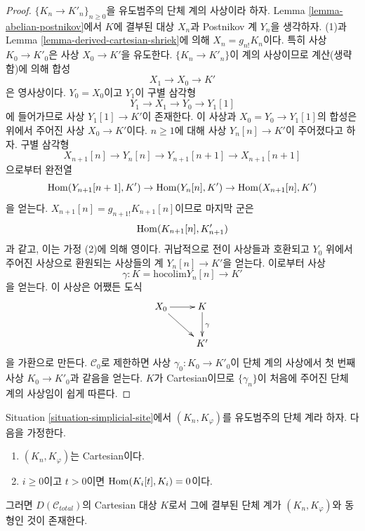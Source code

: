 \begin{proof}
$\{K_n \to K'_n\}_{n \geq 0}$을 유도범주의 단체 계의 사상이라 하자.
Lemma \ref{lemma-abelian-postnikov}에서 $K$에 결부된 대상
$X_n$과 Postnikov 계 $Y_n$을 생각하자.
(1)과 Lemma \ref{lemma-derived-cartesian-shriek}에 의해
$X_n = g_{n!}K_n$이다. 특히 사상 $K_0 \to K'_0$은
사상 $X_0 \to K'$을 유도한다. $\{K_n \to K'_n\}$이
계의 사상이므로 계산(생략함)에 의해 합성
$$
X_1 \to X_0 \to K'
$$
은 영사상이다. $Y_0 = X_0$이고 $Y_1$이 구별 삼각형
$$
Y_1 \to X_1 \to Y_0 \to Y_1[1]
$$
에 들어가므로 사상 $Y_1[1] \to K'$이 존재한다.
이 사상과 $X_0 = Y_0 \to Y_1[1]$의 합성은 위에서 주어진
사상 $X_0 \to K'$이다.
$n \geq 1$에 대해 사상 $Y_n[n] \to K'$이 주어졌다고 하자.
구별 삼각형
$$
X_{n + 1}[n] \to Y_n[n] \to Y_{n + 1}[n + 1] \to X_{n + 1}[n + 1]
$$
으로부터 완전열
$$
\mathop{\mathrm{Hom}}\nolimits(Y_{n + 1}[n + 1], K') \to
\mathop{\mathrm{Hom}}\nolimits(Y_n[n], K') \to
\mathop{\mathrm{Hom}}\nolimits(X_{n + 1}[n], K')
$$
을 얻는다. $X_{n + 1}[n] = g_{n + 1!}K_{n + 1}[n]$이므로
마지막 군은
$$
\mathop{\mathrm{Hom}}\nolimits(K_{n + 1}[n], K'_{n + 1})
$$
과 같고, 이는 가정 (2)에 의해 영이다.
귀납적으로 전이 사상들과 호환되고 $Y_0$ 위에서 주어진 사상으로
환원되는 사상들의 계 $Y_n[n] \to K'$을 얻는다.
이로부터 사상
$$
\gamma :
K = \text{hocolim} Y_n[n]
\longrightarrow
K'
$$
을 얻는다. 이 사상은 어쨌든 도식
$$
\xymatrix{
X_0 \ar[rd] \ar[r] &
K \ar[d]^\gamma \\
& K'
}
$$
을 가환으로 만든다. $\mathcal{C}_0$로 제한하면
사상 $\gamma_0 : K_0 \to K'_0$이 단체 계의 사상에서 첫 번째 사상
$K_0 \to K'_0$과 같음을 얻는다. $K$가 Cartesian이므로
$\{\gamma_n\}$이 처음에 주어진 단체 계의 사상임이 쉽게 따른다.
\end{proof}

\begin{lemma}
\label{lemma-cartesian-object-derived-from-simplicial}
Situation \ref{situation-simplicial-site}에서
$(K_n, K_\varphi)$를 유도범주의 단체 계라 하자.
다음을 가정한다.
\begin{enumerate}
\item $(K_n, K_\varphi)$는 Cartesian이다.
\item $i \geq 0$이고 $t > 0$이면
$\mathop{\mathrm{Hom}}\nolimits(K_i[t], K_i) = 0$이다.
\end{enumerate}
그러면 $D(\mathcal{C}_{total})$의 Cartesian 대상 $K$로서
그에 결부된 단체 계가 $(K_n, K_\varphi)$와 동형인 것이 존재한다.
\end{lemma}

